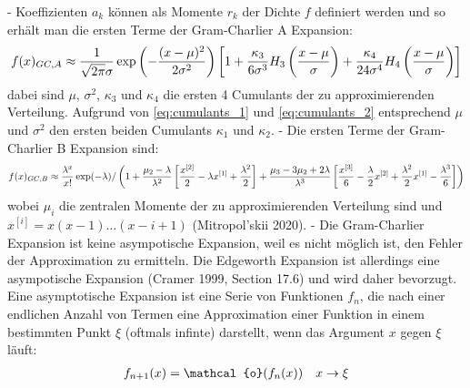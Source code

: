 - Koeffizienten $a_k$ können als Momente $r_k$ der Dichte $f$ definiert werden und so erhält man die ersten Terme der Gram-Charlier A Expansion:
\begin{align}
    f(x)_{GC,A} \approx \frac{1}{\sqrt{2\pi}\sigma}\exp\left(-\frac{(x-\mu)^2}{2\sigma^2}\right) \left[1 + \frac{\kappa_3}{6\sigma^3}H_3\left(\frac{x-\mu}{\sigma}\right) + \frac{\kappa_4}{24\sigma^4}H_4\left(\frac{x-\mu}{\sigma}\right)\right] \notag
\end{align}
dabei sind $\mu$, $\sigma^2$, $\kappa_3$ und $\kappa_4$ die ersten 4 Cumulants der zu approximierenden Verteilung. Aufgrund von \eqref{eq:cumulants_1} und \eqref{eq:cumulants_2} entsprechend $\mu$ und $\sigma^2$ den ersten beiden Cumulants $\kappa_1$ und $\kappa_2$.
- Die ersten Terme der Gram-Charlier B Expansion sind:
\begin{align}
    f(x)_{GC,B} \approx \frac{\lambda^x}{x!}\exp(-\lambda) /\left(1 + \frac{\mu_2 - \lambda}{\lambda^2}\left[\frac{x^{[2]}}{2} - \lambda x^{[1]} + \frac{\lambda^2}{2}\right] + \frac{\mu_3 - 3\mu_2 + 2\lambda}{\lambda^3}\left[\frac{x^{[3]}}{6} - \frac{\lambda}{2}x^{[2]} + \frac{\lambda^2}{2}x^{[1]} - \frac{\lambda^3}{6}\right]\right) \notag
\end{align}
wobei $\mu_i$ die zentralen Momente der zu approximierenden Verteilung sind und $x^{[i]} = x(x-1)\dots (x-i+1)$ (Mitropol'skii 2020).
- Die Gram-Charlier Expansion ist keine asympotische Expansion, weil es nicht möglich ist, den Fehler der Approximation zu ermitteln. Die Edgeworth Expansion ist allerdings eine asympotische Expansion (Cramer 1999, Section 17.6) und wird daher bevorzugt. Eine asymptotische Expansion ist eine Serie von Funktionen $f_n$, die nach einer endlichen Anzahl von Termen eine Approximation einer Funktion in einem bestimmten Punkt $\xi$ (oftmals infinte) darstellt, wenn das Argument $x$ gegen $\xi$ läuft:
\begin{align}
    f_{n+1}(x) = \mathcal{o}(f_n(x)) \quad x\to\xi \notag
\end{align}

